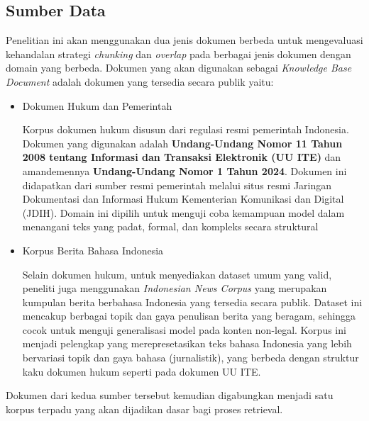 \subsection{Sumber Data}
Penelitian ini akan menggunakan dua jenis dokumen berbeda untuk mengevaluasi kehandalan strategi \textit{chunking} dan \textit{overlap} pada berbagai jenis dokumen dengan domain yang berbeda. Dokumen yang akan digunakan sebagai \textit{Knowledge Base Document} adalah dokumen yang tersedia secara publik yaitu:

\begin{itemize}
    \item Dokumen Hukum dan Pemerintah \par
      Korpus dokumen hukum disusun dari regulasi resmi pemerintah Indonesia. Dokumen yang digunakan adalah \textbf{Undang-Undang Nomor 11 Tahun 2008 tentang Informasi dan Transaksi Elektronik (UU ITE)} dan amandemennya \textbf{Undang-Undang Nomor 1 Tahun 2024}. Dokumen ini didapatkan dari sumber resmi pemerintah melalui situs resmi Jaringan Dokumentasi dan Informasi Hukum Kementerian Komunikasi dan Digital (JDIH). Domain ini dipilih untuk menguji coba kemampuan model dalam menangani teks yang padat, formal, dan kompleks secara struktural
    \item Korpus Berita Bahasa Indonesia \par
      Selain dokumen hukum, untuk menyediakan dataset umum yang valid, peneliti juga menggunakan \textit{Indonesian News Corpus} yang merupakan kumpulan berita berbahasa Indonesia yang tersedia secara publik. Dataset ini mencakup berbagai topik dan gaya penulisan berita yang beragam, sehingga cocok untuk menguji generalisasi model pada konten non-legal. Korpus ini menjadi pelengkap yang merepresetasikan teks bahasa Indonesia yang lebih bervariasi topik dan gaya bahasa (jurnalistik), yang berbeda dengan struktur kaku dokumen hukum seperti pada dokumen UU ITE.
\end{itemize}
Dokumen dari kedua sumber tersebut kemudian digabungkan menjadi satu korpus terpadu yang akan dijadikan dasar bagi proses retrieval.

